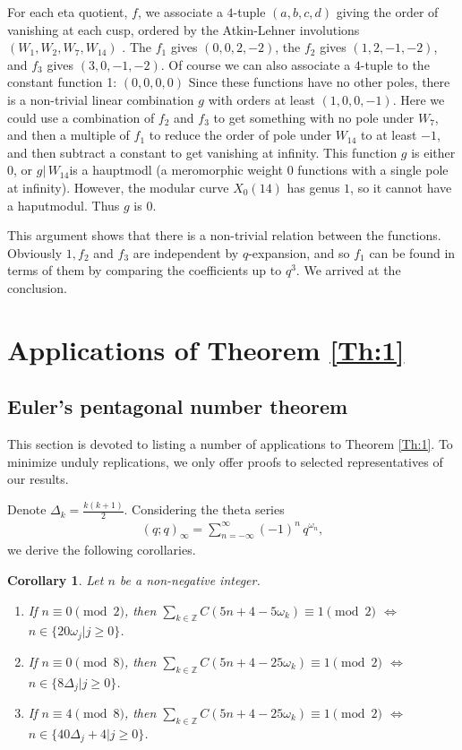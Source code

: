 \documentclass{article}
\newtheorem{corollary}[theorem]{Corollary}
\begin{document}
\smallskip
\noindent
For each eta quotient, $f$, we associate a $4$-tuple $(a,b,c,d)$ giving the order of vanishing at each cusp, ordered by the Atkin-Lehner involutions $(W_1,W_2, W_7, W_{14})$ 
\cite{Atkin70}.
The $f_1$ gives $(0,0,2,-2)$, the $f_2$ gives  $(1,2,-1,-2)$, and $f_3$ gives $(3,0,-1,-2)$. Of course we can also associate a $4$-tuple to the constant function 1: $(0,0,0,0)$ Since these functions have no other poles, there is a non-trivial linear combination $g$ with orders at least $(1,0,0,-1)$. Here we could use a combination of $f_2$ and $f_3$ to get something with no pole under $W_7$, and then a multiple of $f_1$ to reduce the order of pole under $W_14$ to at least $-1$, and then subtract a constant to get vanishing at infinity. 
This function $g$ is either $0$, or $g\vert\,W_14 $is a hauptmodl (a meromorphic weight $0$ functions with a single pole at infinity). However, the modular curve $X_0(14)$ has genus $1$, so it cannot have a haputmodul. Thus $g$ is $0$. 

\smallskip
\noindent
This argument shows that there is a non-trivial relation between the functions. Obviously $1, f_2$ and $f_3$ are independent by $q$-expansion, and so $f_1$ can be found in terms of them by comparing the coefficients up to $q^3$.  We arrived at the conclusion.

\section{Applications of Theorem \ref{Th:1}} \label{S7}

\subsection{Euler's pentagonal number theorem}

This section is devoted to listing a number of applications to Theorem \ref{Th:1}. To minimize unduly replications, we only offer proofs to selected representatives of our results.

Denote $\Delta_k=\frac{k(k+1)}2$. Considering the theta series \cite[Eq. (0.44), p. 16]{Cooper}
\begin{align*}
(q;q)_\infty = \sum_{n=-\infty}^\infty (-1)^n\,q^{\omega_n},
\end{align*}
we derive the following corollaries.

\medskip
\begin{corollary} \label{Cor1} Let $n$ be a non-negative integer.
\begin{enumerate}
    \item [(a)] If $n\equiv 0 \pmod 2$, then $\sum\limits_{k\in\mathbb{Z}}C(5n+4-5\omega_k)\equiv 1 \pmod 2$  $\iff$  $n\in\{20\omega_j\vert j\geq0\}$.
    \item [(b)] If $n\equiv 0 \pmod 8$, then $\sum\limits_{k\in\mathbb{Z}}C(5n+4-25\omega_k)\equiv 1 \pmod 2$  $\iff$  $n\in\{8\Delta_j\vert j\geq0\}$.
    \item [(c)] If $n\equiv 4 \pmod 8$, then $\sum\limits_{k\in\mathbb{Z}}C(5n+4-25\omega_k)\equiv 1 \pmod 2$  $\iff$  $n\in\{40\Delta_j+4\vert j\geq0\}$.
\end{enumerate}
\end{corollary}
\medskip
\end{document}
